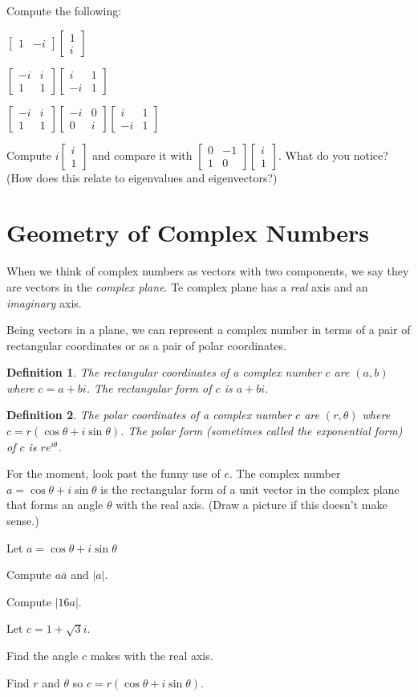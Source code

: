 \documentclass{article}
\newcommand{\mat}[1]{\begin{bmatrix}#1\end{bmatrix}}
\newtheorem{definition}{Definition}
\begin{document}
	Compute the following:
	\begin{Enum}
		\item $\mat{1 &-i}\mat{1\\i}$
		\item $\mat{-i&i\\1&1}\mat{i&1\\-i&1}$
		\item $\mat{-i&i\\1&1}\mat{-i&0\\0&i}\mat{i&1\\-i&1}$
		\item Compute $i\mat{i\\1}$ and compare it
			with $\mat{0&-1\\1&0}\mat{i\\1}$.  What do you notice? (How
			does this relate to eigenvalues and eigenvectors?)
	\end{Enum}

\newpage
\section*{Geometry of Complex Numbers}
	When we think of complex numbers as vectors with two components,
	we say they are vectors in the \emph{complex plane}.  Te
	complex plane has a \emph{real} axis and an \emph{imaginary} axis.

	Being vectors in a plane, we can represent a complex number in terms
	of a pair of rectangular coordinates or as a pair of polar coordinates.

	\begin{definition}
		The \emph{rectangular} coordinates of a complex number $c$
		are $(a,b)$ where $c=a+bi$.  The \emph{rectangular form}
		of $c$ is $a+bi$.
	\end{definition}
	
	\begin{definition}
		The \emph{polar} coordinates of a complex number $c$
		are $(r,\theta)$ where $c=r(\cos\theta +i \sin\theta)$.  
		The \emph{polar form} (sometimes
		called the exponential form)
		of $c$ is $re^{i\theta}$.
	\end{definition}

	For the moment, look past the funny use of $e$.  The complex number
	$a=\cos\theta+i\sin\theta$ is the rectangular form of a unit vector in the complex
	plane that forms an angle $\theta$ with the real axis. (Draw a picture
	if this doesn't make sense.)

	Let $a=\cos\theta+i\sin\theta$
	\begin{Enum}
		\item Compute $a\bar a$ and $|a|$.
		\item Compute $|16a|$.
	\end{Enum}
	Let $c=1+\sqrt{3}i$.
	\begin{Enum}[resume]
		\item Find the angle $c$ makes with the real axis.
		\item Find $r$ and $\theta$ so $c=r(\cos\theta+i\sin\theta)$.
	\end{Enum}
\end{document}
